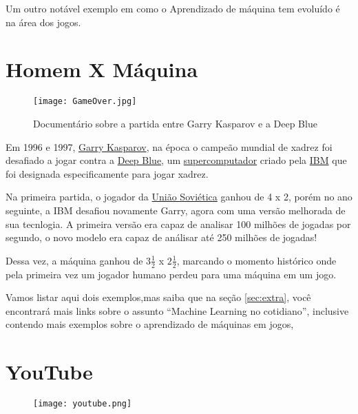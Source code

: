 \documentclass[12pt]{article}
\begin{document}
    Um outro notável exemplo em como o Aprendizado de máquina tem evoluído é
    na área dos jogos.

    \newpage
    \section{Homem X Máquina} \label{sec:deep_blue}

    \begin{figure}[htp]
        \centering
        \texttt{[image: GameOver.jpg]}
        \caption{\centering Documentário sobre a partida entre Garry Kasparov e a Deep Blue}
    \end{figure}

    Em 1996 e 1997, \href{https://pt.wikipedia.org/wiki/Garry_Kasparov}{Garry Kasparov}, 
    na época o campeão mundial de xadrez foi desafiado
    a jogar contra a \href{https://pt.wikipedia.org/wiki/Deep_Blue}{Deep Blue}, um \href{https://canaltech.com.br/produtos/o-que-e-supercomputador/}{supercomputador} 
    criado pela \href{https://pt.wikipedia.org/wiki/IBM}{IBM} que foi designada especificamente para jogar xadrez. 

    Na primeira partida, o jogador da \href{https://pt.wikipedia.org/wiki/Uni%C3%A3o_Sovi%C3%A9tica}{União Soviética} 
    ganhou de 4 x 2, porém no ano seguinte, a IBM desafiou novamente Garry, agora com uma versão melhorada de sua tecnlogia. A 
    primeira versão era capaz de analisar 100 milhões de jogadas por segundo, o novo modelo era capaz
    de análisar até 250 milhões de jogadas!

    Dessa vez, a máquina ganhou de \(3\frac{1}{2}\) x \(2\frac{1}{2}\), marcando o momento histórico 
    onde pela primeira vez um jogador humano perdeu para uma máquina em um jogo.

    Vamos listar aqui dois exemplos,mas saiba que na seção \ref{sec:extra}, você encontrará mais links sobre o assunto “Machine Learning no cotidiano”, inclusive
    contendo mais exemplos sobre o aprendizado de máquinas em jogos, 

    \newpage
    \section{YouTube} \label{sec:youtube}

    \begin{figure}[htp]
        \centering
        \texttt{[image: youtube.png]}
    \end{figure}
\end{document}
